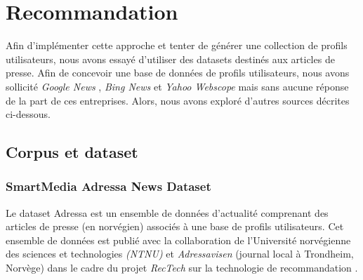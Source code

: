 \newpage
\section{Recommandation}

Afin d'implémenter cette approche et tenter de générer une collection de profils utilisateurs, nous avons essayé d'utiliser des datasets destinés aux articles de presse. Afin de concevoir une base de données de profils utilisateurs, nous avons sollicité \emph{Google News} \cite{bibid}, \emph{Bing News} \cite{bibid} et \emph{Yahoo Webscope} \cite{bibid} mais sans aucune réponse de la part de ces entreprises. Alors, nous avons exploré d'autres sources décrites ci-dessous.

\subsection{Corpus et dataset}
    \subsubsection{SmartMedia Adressa News Dataset}
    Le dataset Adressa est un ensemble de données d'actualité comprenant des articles de presse (en norvégien) associés à une base de profils utilisateurs. Cet ensemble de données est publié avec la collaboration de l'Université norvégienne des sciences et technologies \emph{(NTNU)} et \emph{Adressavisen} (journal local à Trondheim, Norvège) dans le cadre du projet \emph{RecTech} sur la technologie de recommandation \cite{refnorvege}.

